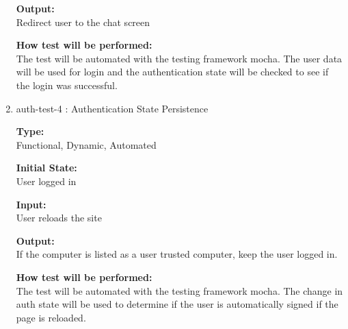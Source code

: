 \documentclass[12pt, titlepage]{article}
\begin{document}
\begin{enumerate}
\textbf{Output:}\\ Redirect user to the chat screen
					
\textbf{How test will be performed:}\\ 
The test will be automated with the testing framework mocha. The user data will be used for login and the authentication state will be checked to see if the login was successful.

\item{auth-test-4 : Authentication State Persistence\\}

\textbf{Type:}\\ Functional, Dynamic, Automated 
					
\textbf{Initial State:}\\ User logged in
					
\textbf{Input:}\\ User reloads the site
					
\textbf{Output:}\\ If the computer is listed as a user trusted computer, keep the user logged in.
					
\textbf{How test will be performed:}\\ 
The test will be automated with the testing framework mocha. The change in auth state will be used to determine if the user is automatically signed if the page is reloaded.


\end{enumerate} 
\end{document}
